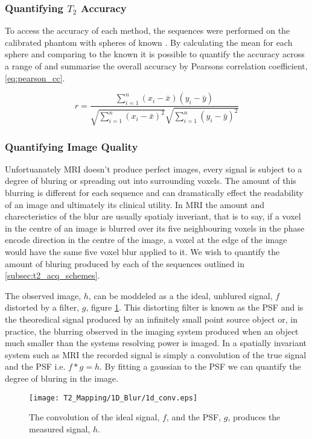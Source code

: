 \subsubsection{Quantifying $T_2$ Accuracy}
To access the accuracy of each method, the sequences were performed on the calibrated phantom with spheres of known \ttwo. By calculating the mean \ttwo for each sphere and comparing to the known \ttwo it is possible to quantify the accuracy across a range of \ttwo and summarise the overall accuracy by Pearsons correlation coefficient, \eqref{eq:pearson_cc}.

\begin{equation}
\label{eq:pearson_cc}
r = \frac{\sum^{n}_{i=1}\left(x_i - \bar{x}\right )\left(y_i - \bar{y}\right )}{\sqrt{\sum^{n}_{i=1}\left(x_i - \bar{x}\right )^2}\sqrt{\sum^{n}_{i=1}\left(y_i - \bar{y}\right )^2}}
\end{equation}

\subsubsection{Quantifying Image Quality}
Unfortuanately \ac{MRI} doesn't produce perfect images, every signal is subject to a degree of bluring or spreading out into surrounding voxels. The amount of this blurring is different for each sequence and can dramatically effect the readability of an image and ultimately its clinical utility. In \ac{MRI} the amount and charecteristics of the blur are usually spatialy inveriant, that is to say, if a voxel in the centre of an image is blurred over its five neighbouring voxels in the phase encode direction in the centre of the image, a voxel at the edge of the image would have the same five voxel blur applied to it. We wish to quantify the amount of bluring produced by each of the sequences outlined in \ref{subsec:t2_acq_schemes}.

The observed image, $h$, can be moddeled as a the ideal, unblured signal, $f$ distorted by a filter, $g$, figure \ref{fig:t2_1d_blur}. This distorting filter is known as the \ac{PSF} and is the theoredical signal produced by an infinitely small point source object or, in practice, the blurring observed in the imaging system produced when an object much smaller than the systems resolving power is imaged. In a spatially invariant system such as \ac{MRI} the recorded signal is simply a convolution of the true signal and the \ac{PSF} i.e. $f \ast g = h$. By fitting a gaussian to the \ac{PSF} we can quantify the degree of bluring in the image. 
\begin{figure}[H]
	\centering
	\texttt{[image: T2\_Mapping/1D\_Blur/1d\_conv.eps]}
	\caption{The convolution of the ideal signal, $f$, and the \ac{PSF}, $g$, produces the measured signal, $h$.}
	\label{fig:t2_1d_blur}	
\end{figure}

